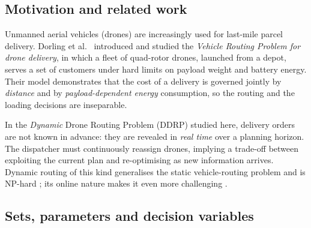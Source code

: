 \documentclass[11pt,a4paper]{article}
\begin{document}
\subsection{Motivation and related work}

Unmanned aerial vehicles (drones) are increasingly used for last-mile parcel
delivery. Dorling et al.~\cite{dorling2016} introduced and studied the
\emph{Vehicle Routing Problem for drone delivery}, in which a fleet of
quad-rotor drones, launched from a depot, serves a set of customers under hard
limits on payload weight and battery energy. Their model demonstrates that the
cost of a delivery is governed jointly by \emph{distance} and by
\emph{payload-dependent energy} consumption, so the routing and the loading
decisions are inseparable.

In the \emph{Dynamic} Drone Routing Problem (DDRP) studied here, delivery
orders are not known in advance: they are revealed in \emph{real time} over a
planning horizon. The dispatcher must continuously reassign drones, implying a
trade-off between exploiting the current plan and re-optimising as new
information arrives. Dynamic routing of this kind generalises the static
vehicle-routing problem and is NP-hard \cite{toth2014}; its online nature makes
it even more challenging \cite{psaraftis1995}.

\subsection{Sets, parameters and decision variables}
\end{document}
